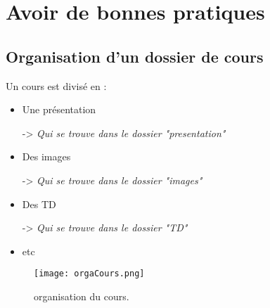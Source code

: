 \documentclass[./beamerCoursIsenLaTeX.tex]{subfiles}
\begin{document}
\section{Avoir de bonnes pratiques}
\subsection{Organisation d'un dossier de cours}
\begin{frame}
Un cours est divisé en : 
\begin{itemize}
\item Une présentation
\item[->] \emph{Qui se trouve dans le dossier "presentation"}
\item Des images
\item[->] \emph{Qui se trouve dans le dossier "images"}
\item Des TD
\item[->] \emph{Qui se trouve dans le dossier "TD"}
\item etc
\end{itemize}
\end{frame}
\begin{frame}
\begin{figure}
\begin{center}
\texttt{[image: orgaCours.png]}\label{fig::orgaCours}
\caption{organisation du cours.}
\end{center}
\end{figure}
\end{frame}
\end{document}
